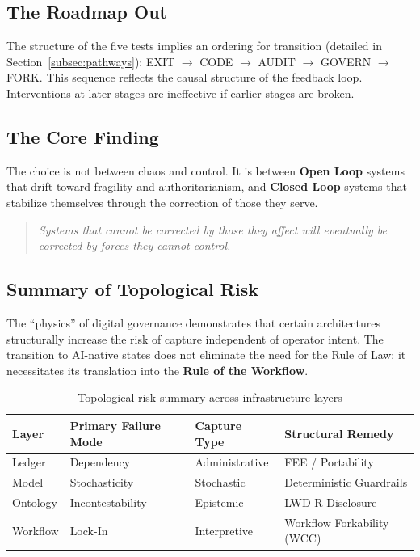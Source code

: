 \documentclass{article}
\begin{document}
\subsection{The Roadmap Out}

The structure of the five tests implies an ordering for transition (detailed in Section~\ref{subsec:pathways}): EXIT $\to$ CODE $\to$ AUDIT $\to$ GOVERN $\to$ FORK. This sequence reflects the causal structure of the feedback loop. Interventions at later stages are ineffective if earlier stages are broken.

\subsection{The Core Finding}

The choice is not between chaos and control. It is between \textbf{Open Loop} systems that drift toward fragility and authoritarianism, and \textbf{Closed Loop} systems that stabilize themselves through the correction of those they serve.

\begin{quote}
\textit{Systems that cannot be corrected by those they affect will eventually be corrected by forces they cannot control.}
\end{quote}

\subsection{Summary of Topological Risk}

The ``physics'' of digital governance demonstrates that certain architectures structurally increase the risk of capture independent of operator intent. The transition to AI-native states does not eliminate the need for the Rule of Law; it necessitates its translation into the \textbf{Rule of the Workflow}.

\begin{table}[htbp]
\centering
\caption{Topological risk summary across infrastructure layers}
\label{tab:topological-risk}
\begin{tabular}{llll}
\toprule
\textbf{Layer} & \textbf{Primary Failure Mode} & \textbf{Capture Type} & \textbf{Structural Remedy} \\
\midrule
Ledger & Dependency & Administrative & FEE / Portability \\
Model & Stochasticity & Stochastic & Deterministic Guardrails \\
Ontology & Incontestability & Epistemic & LWD-R Disclosure \\
Workflow & Lock-In & Interpretive & Workflow Forkability (WCC) \\
\bottomrule
\end{tabular}
\end{table}
\end{document}
